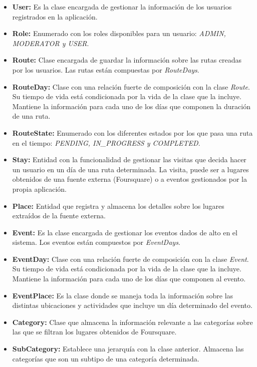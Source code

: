 \begin{itemize}
	\item \textbf{User: } Es la clase encargada de gestionar la información de los usuarios registrados en la aplicación.
	\item \textbf{Role: } Enumerado con los roles disponibles para un usuario: \textit{ADMIN, MODERATOR y USER}.
	\item \textbf{Route: } Clase encargada de guardar la información sobre las rutas creadas por los usuarios. Las rutas están compuestas por \textit{RouteDays}.
	\item \textbf{RouteDay: } Clase con una relación fuerte de composición con la clase \textit{Route}. Su tiempo de vida está condicionada por la vida de la clase que la incluye. Mantiene la información para cada uno de los días que componen la duración de una ruta.
	\item \textbf{RouteState: } Enumerado con los diferentes estados por los que pasa una ruta en el tiempo: \textit{PENDING, IN\_PROGRESS y COMPLETED}.
	\item \textbf{Stay: } Entidad con la funcionalidad de gestionar las visitas que decida hacer un usuario en un día de una ruta determinada. La visita, puede ser a lugares obtenidos de una fuente externa (Foursquare) o a eventos gestionados por la propia aplicación.
	\item \textbf{Place: } Entidad que registra y almacena los detalles sobre los lugares extraídos de la fuente externa.
	\item \textbf{Event: } Es la clase encargada de gestionar los eventos dados de alto en el sistema. Los eventos están compuestos por \textit{EventDays}.
	\item \textbf{EventDay: } Clase con una relación fuerte de composición con la clase \textit{Event}. Su tiempo de vida está condicionada por la vida de la clase que la incluye. Mantiene la información para cada uno de los días que componen al evento.
	\item \textbf{EventPlace: } Es la clase donde se maneja toda la información sobre las distintas ubicaciones y actividades que incluye un día determinado del evento.
	\item \textbf{Category: } Clase que almacena la información relevante a las categorías sobre las que se filtran los lugares obtenidos de Foursquare.
	\item \textbf{SubCategory: } Establece una jerarquía con la clase anterior. Almacena las categorías que son un subtipo de una categoría determinada.
\end{itemize}


